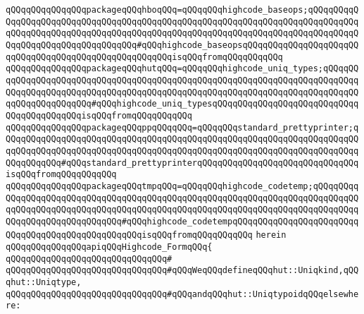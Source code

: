 \verb|qQQqqQQqqQQqqQQqpackageqQQqhboqQQq=qQQqqQQqhighcode_baseops;qQQqqQQqqQQqqQQqqQQqqQQqqQQqqQQqqQQqqQQqqQQqqQQqqQQqqQQqqQQqqQQqqQQqqQQqqQQqqQQqqQQqqQQqqQQqqQQqqQQqqQQqqQQqqQQqqQQqqQQqqQQqqQQqqQQqqQQqqQQqqQQqqQQqqQQqqQQqqQQqqQQqqQQqqQQqqQQq#qQQqhighcode_baseopsqQQqqQQqqQQqqQQqqQQqqQQqqQQqqQQqqQQqqQQqqQQqqQQqqQQqqQQqisqQQqfromqQQqqQQqqQQq|\newline
\verb|qQQqqQQqqQQqqQQqpackageqQQqhutqQQq=qQQqqQQqhighcode_uniq_types;qQQqqQQqqQQqqQQqqQQqqQQqqQQqqQQqqQQqqQQqqQQqqQQqqQQqqQQqqQQqqQQqqQQqqQQqqQQqqQQqqQQqqQQqqQQqqQQqqQQqqQQqqQQqqQQqqQQqqQQqqQQqqQQqqQQqqQQqqQQqqQQqqQQqqQQqqQQqqQQqqQQq#qQQqhighcode_uniq_typesqQQqqQQqqQQqqQQqqQQqqQQqqQQqqQQqqQQqqQQqqQQqisqQQqfromqQQqqQQqqQQq|\newline
\verb|qQQqqQQqqQQqqQQqpackageqQQqppqQQqqQQq=qQQqqQQqstandard_prettyprinter;qQQqqQQqqQQqqQQqqQQqqQQqqQQqqQQqqQQqqQQqqQQqqQQqqQQqqQQqqQQqqQQqqQQqqQQqqQQqqQQqqQQqqQQqqQQqqQQqqQQqqQQqqQQqqQQqqQQqqQQqqQQqqQQqqQQqqQQqqQQqqQQqqQQqqQQq#qQQqstandard_prettyprinterqQQqqQQqqQQqqQQqqQQqqQQqqQQqqQQqisqQQqfromqQQqqQQqqQQq|\newline
\verb|qQQqqQQqqQQqqQQqpackageqQQqtmpqQQq=qQQqqQQqhighcode_codetemp;qQQqqQQqqQQqqQQqqQQqqQQqqQQqqQQqqQQqqQQqqQQqqQQqqQQqqQQqqQQqqQQqqQQqqQQqqQQqqQQqqQQqqQQqqQQqqQQqqQQqqQQqqQQqqQQqqQQqqQQqqQQqqQQqqQQqqQQqqQQqqQQqqQQqqQQqqQQqqQQqqQQqqQQqqQQq#qQQqhighcode_codetempqQQqqQQqqQQqqQQqqQQqqQQqqQQqqQQqqQQqqQQqqQQqqQQqqQQqisqQQqfromqQQqqQQqqQQq|\newline
\verb|herein|\newline
\newline
\verb|qQQqqQQqqQQqqQQqapiqQQqHighcode_FormqQQq{|\newline
\verb|qQQqqQQqqQQqqQQqqQQqqQQqqQQqqQQq#|\newline
\newline
\verb|qQQqqQQqqQQqqQQqqQQqqQQqqQQqqQQq#qQQqWeqQQqdefineqQQqhut::Uniqkind,qQQqhut::Uniqtype,|\newline
\verb|qQQqqQQqqQQqqQQqqQQqqQQqqQQqqQQq#qQQqandqQQqhut::UniqtypoidqQQqelsewhere:|\newline
